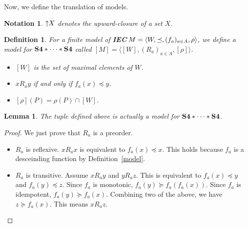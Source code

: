 \documentclass[doctor]{iscs-thesis}
\newcommand{\iec}{{\rm {\textbf{IEC}}}}
\newcommand{\ckv}{{\rm {\textbf{S4}\ast\cdots\ast\textbf{S4}}}}
\newcommand{\tuple}[1]{\langle{#1}\rangle}
\newtheorem{notation}{Notation}
\newtheorem{definition}{Definition}
\newtheorem{lemma}{Lemma}
\begin{document}
Now, we define the translation of models.
\newcommand{\up}{\mathop \uparrow\kern -2pt}
\begin{notation}
 $\up X$ denotes the upward-closure of a set $X$.
\end{notation}

\begin{definition}
 For a finite
 model of \iec\,$M=\model{}$, we define a model for $\ckv$ 
 called $\left[M\right] = \tuple{\left[W\right], (R_a)_{a\in A}, [\rho]}$.
 \begin{itemize}
  \item $[W]$ is the set of maximal elements of $W$.
  \item $x R_a y$ if and only if $f_a(x)\preceq y$.
  \item $[\rho](P) = \rho(P) \cap [W]$.
 \end{itemize}
\end{definition}

\begin{lemma}
 The tuple defined above is actually a model for $\ckv$.
\end{lemma}
\begin{proof}
 We just prove that $R_a$ is a preorder.
\begin{itemize}
 \item $R_a$ is reflexive.
       $x R_a x$ is equivalent to $f_a(x)\preceq x$. This holds because $f_a$ is
       a desceinding function by Definition~\ref{model}.
 \item $R_a$ is transitive.
       Assume $x R_a y$ and $y R_a z$.
       This is equivalent to
       $f_a(x)\preceq y$
       and 
       $f_a(y)\preceq z$.
       Since $f_a$ is monotonic,
       $f_a(y)\succeq  f_a(f_a(x))$.
       Since $f_a$ is idempotent,
       $f_a(y)\succeq  f_a(x)$.
       Combining two of the above,
       we have $z\succeq f_a(x)$.
       This means $x R_a z$.
\end{itemize}
\end{proof}
\end{document}
